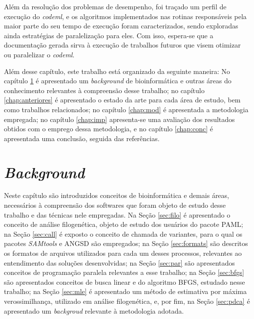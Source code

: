 \documentclass[cic,tc]{iiufrgs}
\begin{document}
Além da resolução dos problemas de desempenho, foi traçado um perfil de
execução do \textit{codeml}, e os algoritmos implementados nas rotinas
responsáveis pela maior parte do seu tempo de execução foram caracterizados,
sendo exploradas ainda estratégias de paralelização para eles. Com isso, espera-se
que a documentação gerada sirva à execução de trabalhos futuros que visem
otimizar ou paralelizar o \textit{codeml}.

%
%
Além desse capítulo, este trabalho está organizado da seguinte maneira: No
capítulo \ref{chap:bg} é apresentado um \textit{background} de bioinformática e
outras áreas do conhecimento relevantes à compreensão desse trabalho; no
capítulo \ref{chap:anteriores} é apresentado o estado da arte para cada área de
estudo, bem como trabalhos relacionados; no capítulo \ref{chap:mod} é
apresentada a metodologia empregada; no capítulo \ref{chap:imp} apresenta-se
uma avaliação dos resultados obtidos com o emprego dessa metodologia, e no
capítulo \ref{chap:conc} é apresentada uma conclusão, seguida das referências.

%
%
%
%

\chapter{\textit{Background}}
\label{chap:bg}

Neste capítulo são introduzidos conceitos de bioinformática e demais áreas,
necessários à compreensão dos softwares que foram objeto de estudo desse
trabalho e das técnicas nele empregadas. Na Seção \ref{sec:filo} é apresentado o
conceito de análise filogenética, objeto de estudo dos usuários do pacote PAML;
na Seção \ref{sec:call} é exposto o conceito de chamada de variantes, para o qual
os pacotes \textit{SAMtools} e ANGSD são empregados; na Seção \ref{sec:formats} são
descritos os formatos de arquivos utilizados para cada um desses processos,
relevantes ao entendimento das soluções desenvolvidas; na Seção \ref{sec:par}
são apresentados conceitos de programação paralela relevantes
a esse trabalho; na Seção \ref{sec:bfgs} são apresentados conceitos de busca
linear e do algoritmo BFGS, estudado nesse trabalho; na Seção \ref{sec:mle} é
apresentado um método de estimativa por máxima verossimilhança, utilizado em
análise filogenética, e, por fim, na Seção \ref{sec:pdca} é apresentado um
\textit{backgroud} relevante à metodologia adotada.

\end{document}
